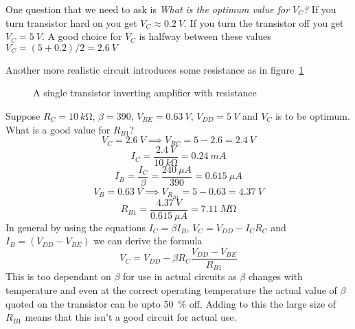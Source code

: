 \documentclass{article}
\begin{document}
    One question that we need to ask is \emph{What is the optimum value for \(V_C\)?} If you turn transistor hard on you get \(V_C\approx \SI{0.2}{V}\). If you turn the transistor off you get \(V_C=\SI{5}{V}\). A good choice for \(V_C\) is halfway between these values \(V_C=(5+0.2)/2=\SI{2.6}{V}\)
    
    Another more realistic circuit introduces some resistance as in figure~\ref{amplifier with resistance}
    
    \begin{figure}[ht]
        \centering
        \caption{A single transistor inverting amplifier with resistance}
        \label{amplifier with resistance}
    \end{figure}
    
    Suppose \(R_C=\SI{10}{k\ohm}\), \(\beta=390\), \(V_{BE}=\SI{0.63}{V}\), \(V_{DD}=\SI{5}{V}\) and \(V_C\) is to be optimum. What is a good value for \(R_{B1}\)?
    \[V_C=\SI{2.6}{V}\implies V_{BC}=5-2.6=\SI{2.4}{V}\]
    \[I_C=\frac{\SI{2.4}{V}}{\SI{10}{k\ohm}}=\SI{0.24}{mA}\]
    \[I_B=\frac{I_C}{\beta}=\frac{\SI{240}{\mu A}}{390}=\SI{0.615}{\mu A}\]
    \[V_B=\SI{0.63}{V}\implies V_{R_{B1}}=5-0.63=\SI{4.37}{V}\]
    \[R_{B1}=\frac{\SI{4.37}{V}}{\SI{0.615}{\mu A}}=\SI{7.11}{M\ohm}\]
    In general by using the equations \(I_C=\beta I_B\), \(V_C=V_{DD}-I_CR_C\) and \(I_B=(V_{DD}-V_{BE})\) we can derive the formula
    \[V_C=V_{DD}-\beta R_C\frac{V_{DD}-V_{BE}}{R_{B1}}\]
    This is too dependant on \(\beta\) for use in actual circuits as \(\beta\) changes with temperature and even at the correct operating temperature the actual value of \(\beta\) quoted on the transistor can be upto \SI{50}{\%} off. Adding to this the large size of \(R_{B1}\) means that this isn't a good circuit for actual use.
    
\end{document}

